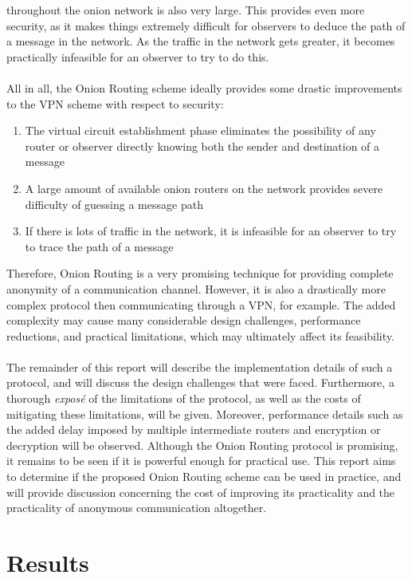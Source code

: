 \documentclass[10pt]{report}
\begin{document}
throughout the onion network is also very large. This provides even more security, as it makes
things extremely difficult for observers to deduce the path of a message in the network. As the
traffic in the network gets greater, it becomes practically infeasible for an observer to try to do
this.\\\\
All in all, the Onion Routing scheme ideally provides some drastic improvements to the VPN scheme
with respect to security:
\begin{enumerate}
	\item The virtual circuit establishment phase eliminates the possibility of any router or
		observer directly knowing both the sender and destination of a message
	\item A large amount of available onion routers on the network provides severe difficulty of
		guessing a message path
	\item If there is lots of traffic in the network, it is infeasible for an observer to try to
		trace the path of a message
\end{enumerate}
Therefore, Onion Routing is a very promising technique for providing complete anonymity of a
communication channel. However, it is also a drastically more complex protocol then communicating
through a VPN, for example. The added complexity may cause many considerable design challenges,
performance reductions, and practical limitations, which may ultimately affect its feasibility.\\\\
The remainder of this report will describe the implementation details of such a protocol, and will
discuss the design challenges that were faced. Furthermore, a thorough \textit{expos\'e} of the
limitations of the protocol, as well as the costs of mitigating these limitations, will be given.
Moreover, performance details such as the added delay imposed by multiple intermediate routers and
encryption or decryption will be observed. Although the Onion Routing protocol is promising, it
remains to be seen if it is powerful enough for practical use. This report aims to determine if the
proposed Onion Routing scheme can be used in practice, and will provide discussion concerning the
cost of improving its practicality and the practicality of anonymous communication altogether.
\chapter{Results}
\end{document}
